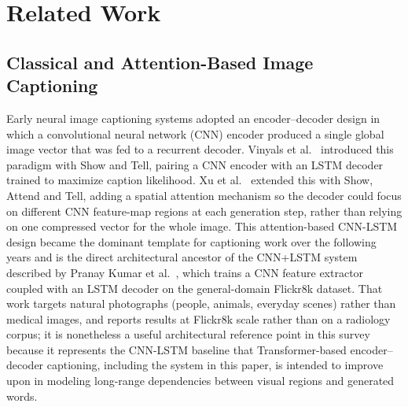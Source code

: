 \documentclass[conference]{IEEEtran}
\begin{document}
\section{Related Work}
\label{sec:related}

\subsection{Classical and Attention-Based Image Captioning}
Early neural image captioning systems adopted an encoder--decoder design in which a convolutional neural network (CNN) encoder produced a single global image vector that was fed to a recurrent decoder. Vinyals et al.~\cite{vinyals2015show} introduced this paradigm with Show and Tell, pairing a CNN encoder with an LSTM decoder trained to maximize caption likelihood. Xu et al.~\cite{xu2015show} extended this with Show, Attend and Tell, adding a spatial attention mechanism so the decoder could focus on different CNN feature-map regions at each generation step, rather than relying on one compressed vector for the whole image. This attention-based CNN-LSTM design became the dominant template for captioning work over the following years and is the direct architectural ancestor of the CNN+LSTM system described by Pranay Kumar et al.~\cite{ijraset2022}, which trains a CNN feature extractor coupled with an LSTM decoder on the general-domain Flickr8k dataset. That work targets natural photographs (people, animals, everyday scenes) rather than medical images, and reports results at Flickr8k scale rather than on a radiology corpus; it is nonetheless a useful architectural reference point in this survey because it represents the CNN-LSTM baseline that Transformer-based encoder--decoder captioning, including the system in this paper, is intended to improve upon in modeling long-range dependencies between visual regions and generated words.
\end{document}
